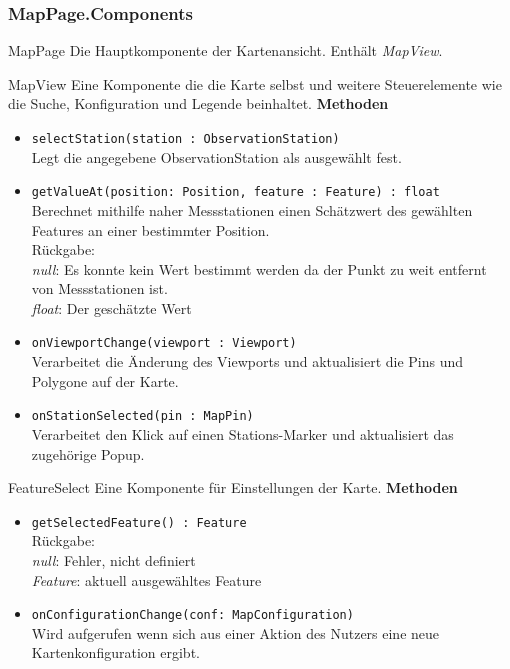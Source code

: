 \subsubsection{MapPage.Components}
    \begin{Class}{MapPage}
        Die Hauptkomponente der Kartenansicht. Enthält \emph{MapView}.
    \end{Class}
    \begin{Class}{MapView}
        Eine Komponente die die Karte selbst und weitere Steuerelemente wie die Suche, Konfiguration und Legende beinhaltet.
        \textbf{Methoden}
        \begin{itemize}
            \item \texttt{selectStation(station : ObservationStation)}
            \\ Legt die angegebene ObservationStation als ausgewählt fest.
            \item \texttt{getValueAt(position: Position, feature : Feature) : float}
            \\ Berechnet mithilfe naher Messstationen einen Schätzwert des gewählten Features an einer bestimmter Position.
            \\ Rückgabe:
            \\ \emph{null}: Es konnte kein Wert bestimmt werden da der Punkt zu weit entfernt von Messstationen ist.
            \\ \emph{float}: Der geschätzte Wert
            \item \texttt{onViewportChange(viewport : Viewport)}
            \\ Verarbeitet die Änderung des Viewports und aktualisiert die Pins und Polygone auf der Karte.
            \item \texttt{onStationSelected(pin : MapPin)}
            \\ Verarbeitet den Klick auf einen Stations-Marker und aktualisiert das zugehörige Popup.
        \end{itemize}
    \end{Class}

    \begin{Class}{FeatureSelect}
        Eine Komponente für Einstellungen der Karte.
        \textbf{Methoden}
        \begin{itemize}
            \item \texttt{getSelectedFeature() : Feature}
            \\ Rückgabe:
            \\ \emph{null}: Fehler, nicht definiert
            \\ \emph{Feature}: aktuell ausgewähltes Feature
            \item \texttt{onConfigurationChange(conf: MapConfiguration)}
            \\ Wird aufgerufen wenn sich aus einer Aktion des Nutzers eine neue Kartenkonfiguration ergibt.
        \end{itemize}
    \end{Class}

